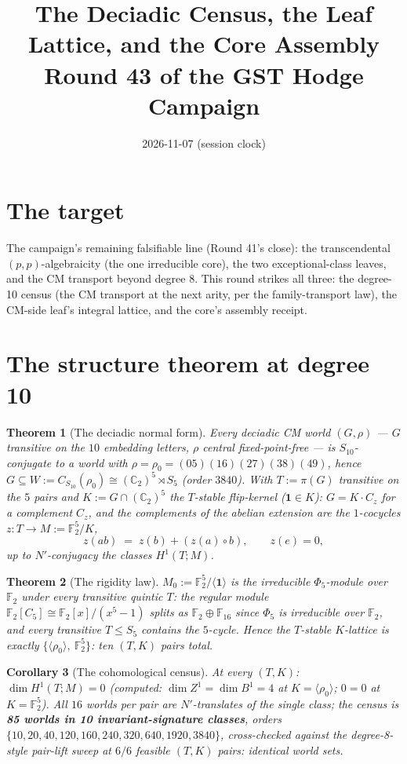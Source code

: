 \documentclass[11pt]{article}
\title{The Deciadic Census, the Leaf Lattice, and the Core Assembly\\ \large Round 43 of the GST Hodge Campaign}
\author{}
\date{2026-11-07 (session clock)}
\newtheorem{theorem}{Theorem}
\newtheorem{corollary}[theorem]{Corollary}
\newcommand{\F}{\mathbb{F}}
\newcommand{\C}{\mathbb{C}}
\begin{document}
\maketitle

\section{The target}

The campaign's remaining falsifiable line (Round 41's close): the transcendental
$(p,p)$-algebraicity (the one irreducible core), the two exceptional-class
leaves, and the CM transport beyond degree $8$. This round strikes all three:
the degree-10 census (the CM transport at the next arity, per the
family-transport law), the CM-side leaf's integral lattice, and the core's
assembly receipt.

\section{The structure theorem at degree 10}

\begin{theorem}[The deciadic normal form]
Every deciadic CM world $(G,\rho)$ --- $G$ transitive on the $10$ embedding
letters, $\rho$ central fixed-point-free --- is $S_{10}$-conjugate to a world
with $\rho = \rho_0 = (05)(16)(27)(38)(49)$, hence
$G \subseteq W := C_{S_{10}}(\rho_0) \cong (\C_2)^5 \rtimes S_5$ (order
$3840$). With $T := \pi(G)$ transitive on the $5$ pairs and
$K := G \cap (\C_2)^5$ the $T$-stable flip-kernel ($\mathbf{1} \in K$):
$G = K \cdot C_z$ for a complement $C_z$, and the complements of the abelian
extension are the $1$-cocycles $z : T \to M := \F_2^5/K$,
\[
z(ab) \;=\; z(b) + (z(a) \circ b), \qquad z(e) = 0,
\]
up to $N'$-conjugacy the classes $H^1(T; M)$.
\end{theorem}

\begin{theorem}[The rigidity law]
$M_0 := \F_2^5/\langle \mathbf{1} \rangle$ is the \emph{irreducible}
$\Phi_5$-module over $\F_2$ under every transitive quintic $T$: the regular
module $\F_2[C_5] \cong \F_2[x]/(x^5 - 1)$ splits as
$\F_2 \oplus \F_{16}$ since $\Phi_5$ is irreducible over $\F_2$, and every
transitive $T \le S_5$ contains the $5$-cycle. Hence the $T$-stable
$K$-lattice is \emph{exactly} $\{\langle \rho_0\rangle,\ \F_2^5\}$: ten
$(T,K)$ pairs total.
\end{theorem}

\begin{corollary}[The cohomological census]
At every $(T, K)$: $\dim H^1(T; M) = 0$ (computed: $\dim Z^1 = \dim B^1 = 4$
at $K = \langle\rho_0\rangle$; $0 = 0$ at $K = \F_2^5$). All $16$ worlds per
pair are $N'$-translates of the single class; the census is
\textbf{85 worlds in 10 invariant-signature classes}, orders
$\{10, 20, 40, 120, 160, 240, 320, 640, 1920, 3840\}$, cross-checked against
the degree-8-style pair-lift sweep at $6/6$ feasible $(T,K)$ pairs:
identical world sets.
\end{corollary}
\end{document}
